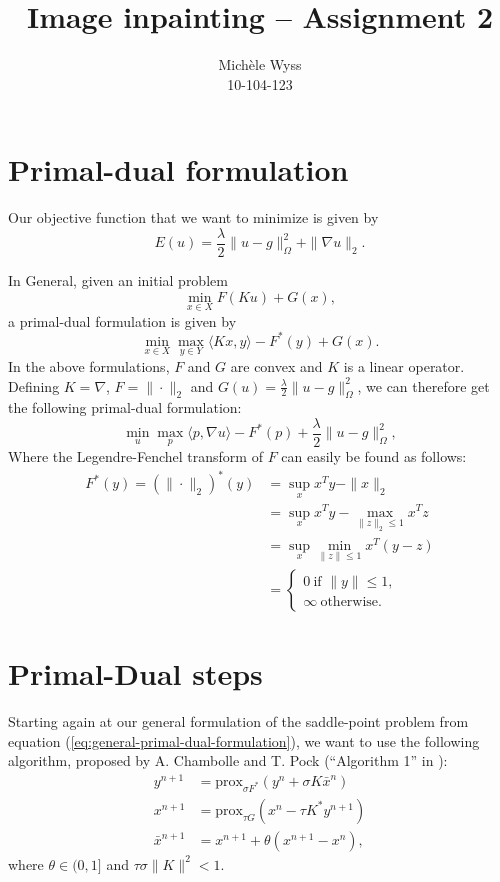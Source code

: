 \documentclass{paper}
\title{Image inpainting -- Assignment 2}
\author{Mich\`ele Wyss \\10-104-123}
\newcommand{\prox}{\text{prox}}
\begin{document}
\maketitle


%

\section{Primal-dual formulation}
\label{sec:primal-dual-formulation}
Our objective function that we want to minimize is given by 
$$E(u) = \frac{\lambda}{2} \|u-g\|_\Omega^2 + \|\nabla u\|_2.$$

In General, given an initial problem
$$\min_{x \in X}F(Ku) + G(x),$$
a primal-dual formulation is given by
\begin{equation}
\min_{x \in X} \max_{y \in Y} \langle Kx, y \rangle - F^*(y) + G(x). 
\label{eq:general-primal-dual-formulation}
\end{equation}
In the above formulations, $F$ and $G$ are convex and $K$ is a linear operator. Defining $K = \nabla$, $F = \|\cdot\|_2$ and $G(u) = \frac{\lambda}{2}\|u-g\|_\Omega^2$, we can therefore get the following primal-dual formulation:
$$\min_u \max_p \langle p,\nabla u \rangle - F^*(p) + \frac{\lambda}{2} \|u-g\|_\Omega^2,$$
Where the Legendre-Fenchel transform of $F$ can easily be found as follows:
\begin{align*}
 F^*(y) = (\|\cdot \|_2)^* (y) &= \sup_x x^Ty - \|x\|_2 \\
 &= \sup_x x^Ty - \max_{\|z\|_2 \leq 1} x^Tz \\
 &= \sup_x \min_{\|z\| \leq 1} x^T (y-z) \\
 &= \begin{cases} 0 ~ \text{if } \|y\| \leq 1, \\ \infty ~ \text{otherwise.} \end{cases}
\end{align*}

\section{Primal-Dual steps}
Starting again at our general formulation of the saddle-point problem from equation (\ref{eq:general-primal-dual-formulation}), we want to use the following algorithm, proposed by A. Chambolle and T. Pock  (``Algorithm 1'' in \cite{chambolle2011first}):
\begin{align*}
 y^{n+1} &= \prox_{\sigma F^*}(y^n + \sigma K \bar x^n) \\
 x^{n+1} &= \prox_{\tau G}(x^n - \tau K^* y^{n+1}) \\
 \bar x^{n+1} &= x^{n+1} + \theta(x^{n+1} - x^n),
\end{align*}
where $\theta \in (0,1]$ and $\tau \sigma \|K\|^2 < 1.$ 
\end{document}
